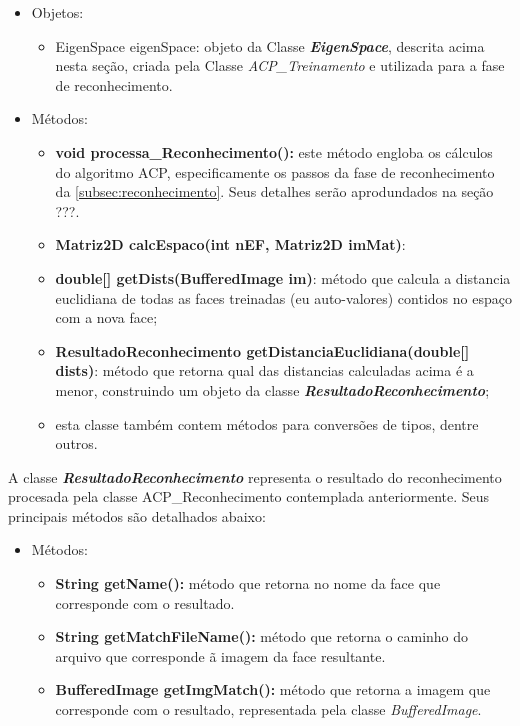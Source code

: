 \begin{itemize}	
		\item Objetos:
	\begin{itemize}
		\item EigenSpace eigenSpace: objeto da Classe \textbf{\textit{EigenSpace}}, descrita acima nesta seção, criada pela Classe \textit{ACP\_Treinamento} e utilizada para a fase de reconhecimento.
	\end{itemize}
	
	
	\item Métodos:
	\begin{itemize}
		\item \textbf{void processa\_Reconhecimento():} este método engloba os cálculos do algoritmo ACP, especificamente os passos da fase de reconhecimento da \autoref{subsec:reconhecimento}. Seus detalhes serão aprodundados na seção ???.
		
		\item \textbf{Matriz2D calcEspaco(int nEF, Matriz2D imMat)}:
		
		\item \textbf{double[] getDists(BufferedImage im)}: método que calcula a distancia euclidiana de todas as faces treinadas (eu auto-valores) contidos no espaço com a nova face;
		
		\item \textbf{ResultadoReconhecimento getDistanciaEuclidiana(double[] dists)}: método que retorna qual das distancias calculadas acima é a menor, construindo um objeto da classe \textit{\textbf{ResultadoReconhecimento}};
		
		\item esta classe também contem métodos para conversões de tipos, dentre outros.
		
		
	\end{itemize}
\end{itemize}



A classe \textit{\textbf{ResultadoReconhecimento}} representa o resultado do reconhecimento procesada pela classe ACP\_Reconhecimento contemplada anteriormente. Seus principais métodos são detalhados abaixo:


\begin{itemize}	
	\item Métodos:
	\begin{itemize}
		\item \textbf{String getName():} método que retorna no nome da face que corresponde com o resultado.		
		\item \textbf{String getMatchFileName():} método que retorna o caminho do arquivo que corresponde ã imagem da face resultante.
		\item \textbf{BufferedImage getImgMatch():} método que retorna a imagem que corresponde com o resultado, representada pela classe \textit{BufferedImage}.
	\end{itemize}
\end{itemize}





